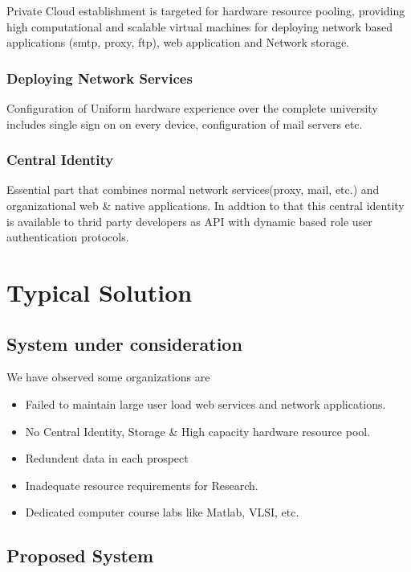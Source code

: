 \documentclass[12pt]{report}
\begin{document}
	Private Cloud establishment is targeted for hardware resource pooling, providing high computational and scalable virtual machines for deploying network based applications (smtp, proxy, ftp), web application and Network storage.
	
\subsection{Deploying Network Services}

	Configuration of Uniform hardware experience over the complete university includes single sign on on every device, configuration of mail servers etc.
	
\subsection{Central Identity}

	Essential part that combines normal network services(proxy, mail, etc.) and organizational web \& native applications. In addtion to that this central identity is available to thrid party developers as API with dynamic based role user authentication protocols.	
	

\chapter{Typical Solution}

\section{System under consideration}

	We have observed some organizations are 
	\begin{itemize}
		\item Failed to maintain large user load web services  and network applications.
		\item No Central Identity, Storage \& High capacity hardware resource pool.
		\item Redundent data in each prospect
		\item Inadequate resource requirements for Research.
		\item Dedicated computer course labs like Matlab, VLSI, etc. 
	\end{itemize}

\section{Proposed System}
\end{document}
